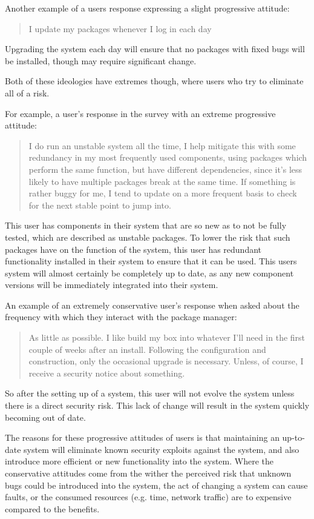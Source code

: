 Another example of a users response expressing a slight progressive attitude:
\begin{quotation}
I update my packages whenever I log in each day
\end{quotation}
Upgrading the system each day will ensure that no packages with fixed bugs will be installed, though may require significant change.

Both of these ideologies have extremes though, where users who try to eliminate all of a risk.

For example, a user's response in the survey with an extreme progressive attitude:
\begin{quotation}
I do run an unstable system all the time, I help mitigate this with some redundancy in my most frequently used components, 
using packages which perform the same function, but have different dependencies, since it's less likely to have multiple packages break at the same time. 
If something is rather buggy for me, I tend to update on a more frequent basis to check for the next stable point to jump into.
\end{quotation}
This user has components in their system that are so new as to not be fully tested, which are described as unstable packages.
To lower the risk that such packages have on the function of the system, this user has redundant functionality installed in their system to ensure that it can be used.
This users system will almost certainly be completely up to date, as any new component versions will be immediately integrated into their system.

An example of an extremely conservative user's response when asked about the frequency with which they interact with the package manager:
\begin{quotation}
As little as possible. I like build my box into whatever I'll need in the first couple of weeks after an install. 
Following the configuration and construction, only the occasional upgrade is necessary. 
Unless, of course, I receive a security notice about something.
\end{quotation}
So after the setting up of a system, this user will not evolve the system unless there is a direct security risk.
This lack of change will result in the system quickly becoming out of date.

The reasons for these progressive attitudes of users is that maintaining an up-to-date system will eliminate known security exploits against the system,
and also introduce more efficient or new functionality into the system.
Where the conservative attitudes come from the wither the perceived risk that unknown bugs could be introduced into the system, the act of changing a system can cause faults,
or the consumed resources (e.g. time, network traffic) are to expensive compared to the benefits.

